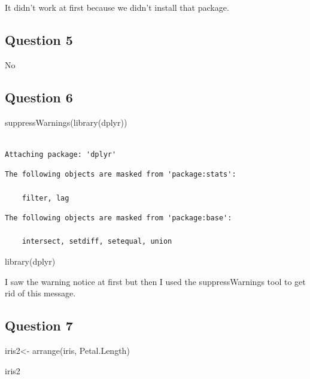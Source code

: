 \documentclass[
  letterpaper,
  DIV=11,
  numbers=noendperiod]{scrartcl}
\newenvironment{Shaded}{\begin{snugshade}}{\end{snugshade}}
\newcommand{\FunctionTok}[1]{\textcolor[rgb]{0.28,0.35,0.67}{#1}}
\newcommand{\NormalTok}[1]{\textcolor[rgb]{0.00,0.23,0.31}{#1}}
\newcommand{\OtherTok}[1]{\textcolor[rgb]{0.00,0.23,0.31}{#1}}
\begin{document}
It didn't work at first because we didn't install that package.

\subsection{Question 5}\label{question-5}

No

\subsection{Question 6}\label{question-6}

\begin{Shaded}
\begin{Highlighting}[]
\FunctionTok{suppressWarnings}\NormalTok{(}\FunctionTok{library}\NormalTok{(dplyr))}
\end{Highlighting}
\end{Shaded}

\begin{verbatim}

Attaching package: 'dplyr'
\end{verbatim}

\begin{verbatim}
The following objects are masked from 'package:stats':

    filter, lag
\end{verbatim}

\begin{verbatim}
The following objects are masked from 'package:base':

    intersect, setdiff, setequal, union
\end{verbatim}

\begin{Shaded}
\begin{Highlighting}[]
\FunctionTok{library}\NormalTok{(dplyr)}
\end{Highlighting}
\end{Shaded}

I saw the warning notice at first but then I used the suppressWarnings
tool to get rid of this message.

\subsection{Question 7}\label{question-7}

\begin{Shaded}
\begin{Highlighting}[]
\NormalTok{iris2}\OtherTok{\textless{}{-}} \FunctionTok{arrange}\NormalTok{(iris, Petal.Length)}

\NormalTok{iris2}
\end{Highlighting}
\end{Shaded}
\end{document}
